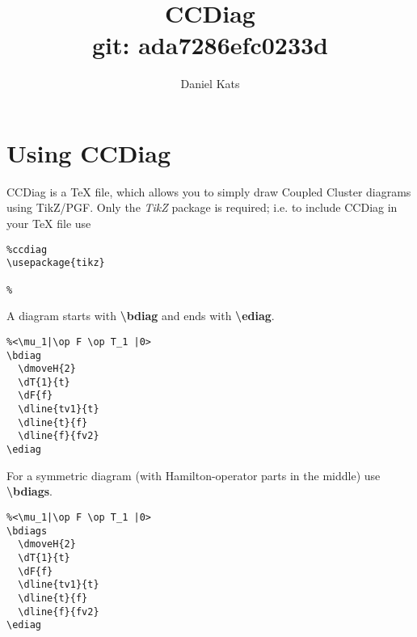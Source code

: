 \documentclass[a4paper]{article}
\begin{document}
\author{Daniel Kats}
\title{CCDiag \\ \normalsize git: ada7286efc0233d}

\maketitle

\tableofcontents

\section{Using CCDiag}

CCDiag is a TeX file, which allows you to simply draw Coupled Cluster diagrams using TikZ/PGF.
Only the {\it TikZ} package is required; i.e. to include CCDiag in your TeX file use
\begin{lstlisting}
%ccdiag
\usepackage{tikz}

%  
\end{lstlisting}

A diagram starts with {\bf \textbackslash bdiag} and ends with {\bf \textbackslash ediag}.

 \begin{minipage}[b]{0.55\linewidth}\centering
  \begin{lstlisting}
%<\mu_1|\op F \op T_1 |0>
\bdiag
  \dmoveH{2}
  \dT{1}{t}
  \dF{f}
  \dline{tv1}{t}
  \dline{t}{f}
  \dline{f}{fv2}
\ediag 
  \end{lstlisting}
 \end{minipage}
 \begin{minipage}[b]{0.45\linewidth}\centering
    \bdiag
    \ediag
 \end{minipage}

For a symmetric diagram (with Hamilton-operator parts in the middle) use {\bf \textbackslash bdiags}.

 \begin{minipage}[b]{0.55\linewidth}\centering
  \begin{lstlisting}
%<\mu_1|\op F \op T_1 |0>
\bdiags
  \dmoveH{2}
  \dT{1}{t}
  \dF{f}
  \dline{tv1}{t}
  \dline{t}{f}
  \dline{f}{fv2}
\ediag 
  \end{lstlisting}
 \end{minipage}
 \begin{minipage}[b]{0.45\linewidth}\centering
    \bdiags
    \ediag
 \end{minipage}
\end{document}
